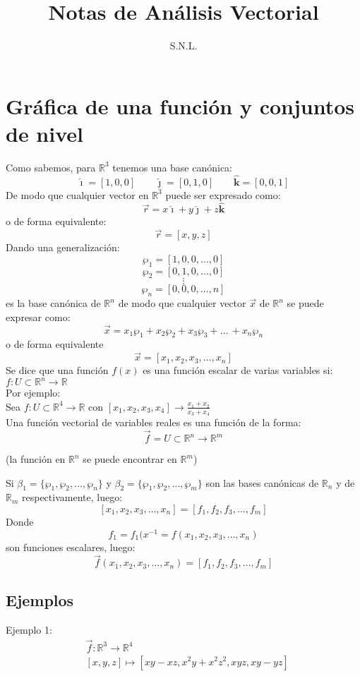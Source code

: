 \documentclass[a4paper]{article}
\title{Notas de Análisis Vectorial}
\author{S.N.L.}
\date{}
\newcommand{\ihat}{\boldsymbol{\hat{\imath}}}
\newcommand{\jhat}{\boldsymbol{\hat{\jmath}}}
\newcommand{\khat}{\boldsymbol{\hat{\bm{k}}}}
\begin{document}
\maketitle
\section{Gráfica de una función y conjuntos de nivel}
Como sabemos, para $\mathbb{R}^3$ tenemos una base canónica:
\[\ihat=[1,0,0]\qquad \jhat=[0,1,0]\qquad \khat=[0,0,1]\]
De modo que cualquier vector en $\mathbb{R}^3$ puede ser expresado como:
\[\vec{r}=x\ihat+y\jhat+z\khat \]
o de forma equivalente:
\[\vec{r}=[x,y,z]\]
Dando una generalización:
\[\wp_1=[1,0,0,\ldots,0]\]
\[\wp_2=[0,1,0,\ldots,0]\]
\[\vdots\]
\[\wp_n=[0,0,0,\ldots,n]\]
es la base canónica de $\mathbb{R}^n$ de modo que cualquier vector $\vec{x}$ de $\mathbb{R}^n$ se puede expresar como:
\[\vec{x}=x_1\wp_1+x_2\wp_2+x_3\wp_3+\ldots\,+x_n\wp_n\]
o de forma equivalente
\[\vec{x}=[x_1,x_2,x_3,\ldots,x_n]\]
Se dice que una función $f(x)$ es una función escalar de varias variables si: $f: U \subset \mathbb{R}^n \rightarrow \mathbb{R}$\\Por ejemplo:\\
\hspace*{3em} Sea $f:U\subset\mathbb{R}^4\rightarrow\mathbb{R}$ con $[x_1,x_2,x_3,x_4]\longrightarrow \frac{x_1+x_2}{x_3+x_4}$\\
Una función vectorial de variables reales es una función de la forma:
\[\vec{f}=U\subset\mathbb{R}^n\longrightarrow\mathbb{R}^m\]
\begin{center}
\small{(la función en $\mathbb{R}^n$ se puede encontrar en $\mathbb{R}^m$)}\\
\end{center}
Si $\beta_1=\{\wp_1,\wp_2,\ldots,\wp_n\}$ y $\beta_2=\{\wp_1,\wp_2,\ldots,\wp_m\}$
son las bases canónicas de $\mathbb{R}_n$ y de $\mathbb{R}_m$ respectivamente, luego:
\[[x_1,x_2,x_3,\ldots,x_n]=[f_1,f_2,f_3,\ldots,f_m]\]
Donde
\[f_1=f_1(x^{-1}=f(x_1,x_2,x_3,\ldots,x_n)\]
son funciones escalares, luego:
\[\vec{f}(x_1,x_2,x_3,\ldots,x_n)=[f_1,f_2,f_3,\ldots,f_m]\]
\subsection{Ejemplos}
Ejemplo 1:
\[
\begin{split}
&\vec{f}:\mathbb{R}^3\longrightarrow\mathbb{R}^4\\
&[x,y,z]\longmapsto[xy-xz,x^2y+x^2z^2,xyz,xy-yz]
\end{split}
\]
\end{document}
